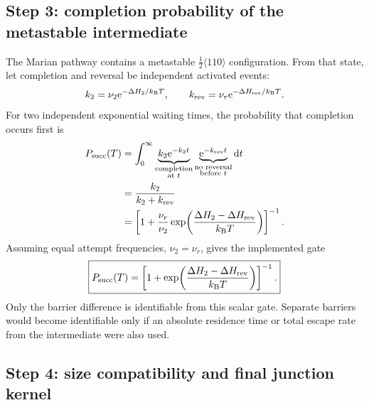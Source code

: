 \documentclass[11pt,a4paper]{article}
\newcommand{\kb}{k_{\mathrm B}}
\newcommand{\half}{\tfrac12}
\newcommand{\dd}{\mathrm d}
\newcommand{\e}{\mathrm e}
\begin{document}
\subsection{Step 3: completion probability of the metastable intermediate}

The Marian pathway contains a metastable $\half\langle110\rangle$ configuration.
From that state, let completion and reversal be independent activated events:
\begin{equation}
 k_2=\nu_2\e^{-\Delta H_2/\kb T},\qquad
 k_{\rm rev}=\nu_r\e^{-\Delta H_{\rm rev}/\kb T}.                     \label{eq:compRates}
\end{equation}
For two independent exponential waiting times, the probability that completion
occurs first is
\begin{align}
 P_{\rm succ}(T)
 &=\int_0^\infty\underbrace{k_2\e^{-k_2t}}_{\substack{\text{completion}\\
 \text{at }t}}\underbrace{\e^{-k_{\rm rev}t}}_{\substack{\text{no reversal}\\
 \text{before }t}}\dd t                                               \label{eq:hazardInt}\\
 &=\frac{k_2}{k_2+k_{\rm rev}}                                        \label{eq:hazard}\\
 &=\left[1+\frac{\nu_r}{\nu_2}
 \exp\!\left(\frac{\Delta H_2-\Delta H_{\rm rev}}{\kb T}\right)\right]^{-1}. \label{eq:Pgeneral}
\end{align}
Assuming equal attempt frequencies, $\nu_2=\nu_r$, gives the implemented gate
\begin{equation}
 \boxed{P_{\rm succ}(T)=
 \left[1+\exp\!\left(\frac{\Delta H_2-\Delta H_{\rm rev}}{\kb T}\right)\right]^{-1}.} \label{eq:Psucc}
\end{equation}
Only the barrier difference is identifiable from this scalar gate.  Separate
barriers would become identifiable only if an absolute residence time or total
escape rate from the intermediate were also used.

\subsection{Step 4: size compatibility and final junction kernel}
\end{document}
